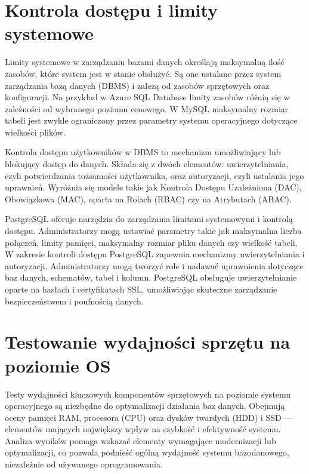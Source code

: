 \documentclass[a4paper,11pt,polish]{sphinxmanual}
\begin{document}
\section{Kontrola dostępu i limity systemowe}
\label{\detokenize{Wydajnosc-Skalowanie-i-Replikacja/index:kontrola-dostepu-i-limity-systemowe}}
\sphinxAtStartPar
Limity systemowe w zarządzaniu bazami danych określają maksymalną ilość zasobów, które system jest w stanie obsłużyć. Są one ustalane przez system zarządzania bazą danych (DBMS) i zależą od zasobów sprzętowych oraz konfiguracji. Na przykład w Azure SQL Database limity zasobów różnią się w zależności od wybranego poziomu cenowego. W MySQL maksymalny rozmiar tabeli jest zwykle ograniczony przez parametry systemu operacyjnego dotyczące wielkości plików.

\sphinxAtStartPar
Kontrola dostępu użytkowników w DBMS to mechanizm umożliwiający lub blokujący dostęp do danych. Składa się z dwóch elementów: uwierzytelniania, czyli potwierdzania tożsamości użytkownika, oraz autoryzacji, czyli ustalania jego uprawnień. Wyróżnia się modele takie jak Kontrola Dostępu Uzależniona (DAC), Obowiązkowa (MAC), oparta na Rolach (RBAC) czy na Atrybutach (ABAC).

\sphinxAtStartPar
PostgreSQL oferuje narzędzia do zarządzania limitami systemowymi i kontrolą dostępu. Administratorzy mogą ustawiać parametry takie jak maksymalna liczba połączeń, limity pamięci, maksymalny rozmiar pliku danych czy wielkość tabeli. W zakresie kontroli dostępu PostgreSQL zapewnia mechanizmy uwierzytelniania i autoryzacji. Administratorzy mogą tworzyć role i nadawać uprawnienia dotyczące baz danych, schematów, tabel i kolumn. PostgreSQL obsługuje uwierzytelnianie oparte na hasłach i certyfikatach SSL, umożliwiając skuteczne zarządzanie bezpieczeństwem i poufnością danych.


\section{Testowanie wydajności sprzętu na poziomie OS}
\label{\detokenize{Wydajnosc-Skalowanie-i-Replikacja/index:testowanie-wydajnosci-sprzetu-na-poziomie-os}}
\sphinxAtStartPar
Testy wydajności kluczowych komponentów sprzętowych na poziomie systemu operacyjnego są niezbędne do optymalizacji działania baz danych. Obejmują oceny pamięci RAM, procesora (CPU) oraz dysków twardych (HDD) i SSD — elementów mających największy wpływ na szybkość i efektywność systemu. Analiza wyników pomaga wskazać elementy wymagające modernizacji lub optymalizacji, co pozwala podnieść ogólną wydajność systemu bazodanowego, niezależnie od używanego oprogramowania.
\end{document}
